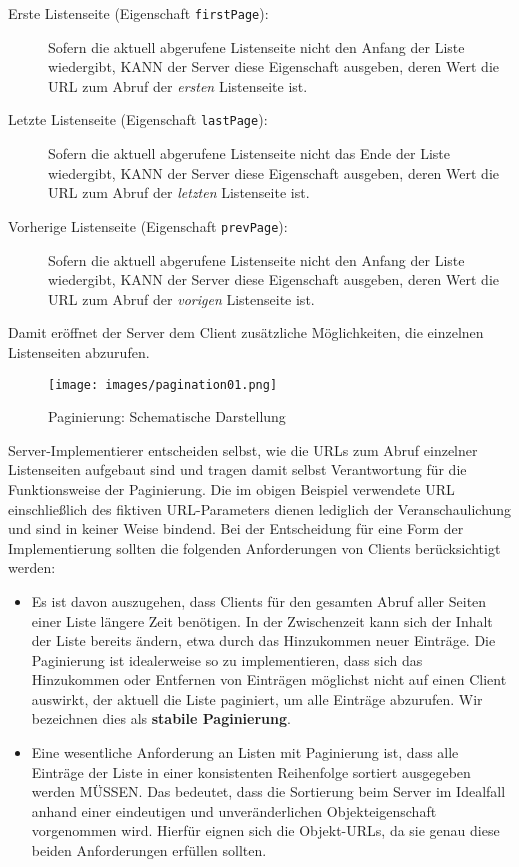 \documentclass[,a4paper]{article}
\makeatletter
\def\maxwidth{\ifdim\Gin@nat@width>\linewidth\linewidth
\else\Gin@nat@width\fi}
\let\Oldincludegraphics\includegraphics
\renewcommand{\includegraphics}[1]{\Oldincludegraphics[width=\maxwidth]{#1}}
\makeatother
\begin{document}
\begin{description}
\item[Erste Listenseite (Eigenschaft \texttt{firstPage}):]
Sofern die aktuell abgerufene Listenseite nicht den Anfang der Liste
wiedergibt, KANN der Server diese Eigenschaft ausgeben, deren Wert die
URL zum Abruf der \emph{ersten} Listenseite ist.
\item[Letzte Listenseite (Eigenschaft \texttt{lastPage}):]
Sofern die aktuell abgerufene Listenseite nicht das Ende der Liste
wiedergibt, KANN der Server diese Eigenschaft ausgeben, deren Wert die
URL zum Abruf der \emph{letzten} Listenseite ist.
\item[Vorherige Listenseite (Eigenschaft \texttt{prevPage}):]
Sofern die aktuell abgerufene Listenseite nicht den Anfang der Liste
wiedergibt, KANN der Server diese Eigenschaft ausgeben, deren Wert die
URL zum Abruf der \emph{vorigen} Listenseite ist.
\end{description}

Damit eröffnet der Server dem Client zusätzliche Möglichkeiten, die
einzelnen Listenseiten abzurufen.

\begin{figure}[htbp]
\centering
\texttt{[image: images/pagination01.png]}
\caption{Paginierung: Schematische Darstellung}
\end{figure}

Server-Implementierer entscheiden selbst, wie die URLs zum Abruf
einzelner Listenseiten aufgebaut sind und tragen damit selbst
Verantwortung für die Funktionsweise der Paginierung. Die im obigen
Beispiel verwendete URL einschließlich des fiktiven URL-Parameters
dienen lediglich der Veranschaulichung und sind in keiner Weise bindend.
Bei der Entscheidung für eine Form der Implementierung sollten die
folgenden Anforderungen von Clients berücksichtigt werden:

\begin{itemize}
\item
  Es ist davon auszugehen, dass Clients für den gesamten Abruf aller
  Seiten einer Liste längere Zeit benötigen. In der Zwischenzeit kann
  sich der Inhalt der Liste bereits ändern, etwa durch das Hinzukommen
  neuer Einträge. Die Paginierung ist idealerweise so zu implementieren,
  dass sich das Hinzukommen oder Entfernen von Einträgen möglichst nicht
  auf einen Client auswirkt, der aktuell die Liste paginiert, um alle
  Einträge abzurufen. Wir bezeichnen dies als \textbf{stabile
  Paginierung}.
\item
  Eine wesentliche Anforderung an Listen mit Paginierung ist, dass alle
  Einträge der Liste in einer konsistenten Reihenfolge sortiert
  ausgegeben werden MÜSSEN. Das bedeutet, dass die Sortierung beim
  Server im Idealfall anhand einer eindeutigen und unveränderlichen
  Objekteigenschaft vorgenommen wird. Hierfür eignen sich die
  Objekt-URLs, da sie genau diese beiden Anforderungen erfüllen sollten.
\end{itemize}
\end{document}
